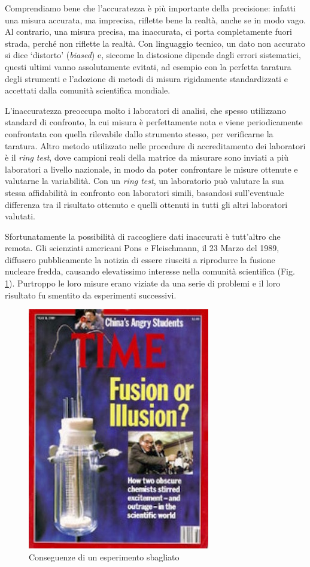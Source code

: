 \documentclass[a4paper,12pt,oneside]{book}
\begin{document}
Comprendiamo bene che l'accuratezza è più importante della precisione: infatti una misura accurata, ma imprecisa, riflette bene la realtà, anche se in modo vago. Al contrario, una misura precisa, ma inaccurata, ci porta completamente fuori strada, perché non riflette la realtà. Con linguaggio tecnico, un dato non accurato si dice `distorto' (\emph{biased}) e, siccome la distosione dipende dagli errori sistematici, questi ultimi vanno assolutamente evitati, ad esempio con la perfetta taratura degli strumenti e l'adozione di metodi di misura rigidamente standardizzati e accettati dalla comunità scientifica mondiale.

L'inaccuratezza preoccupa molto i laboratori di analisi, che spesso utilizzano standard di confronto, la cui misura è perfettamente nota e viene periodicamente confrontata con quella rilevabile dallo strumento stesso, per verificarne la taratura. Altro metodo utilizzato nelle procedure di accreditamento dei laboratori è il \emph{ring test}, dove campioni reali della matrice da misurare sono inviati a più laboratori a livello nazionale, in modo da poter confrontare le misure ottenute e valutarne la variabilità. Con un \emph{ring test}, un laboratorio può valutare la sua stessa affidabilità in confronto con laboratori simili, basandosi sull'eventuale differenza tra il risultato ottenuto e quelli ottenuti in tutti gli altri laboratori valutati.

Sfortunatamente la possibilità di raccogliere dati inaccurati è tutt'altro che remota. Gli scienziati americani Pons e Fleischmann, il 23 Marzo del 1989, diffusero pubblicamente la notizia di essere riusciti a riprodurre la fusione nucleare fredda, causando elevatissimo interesse nella comunità scientifica (Fig. \ref{fig:figName2}). Purtroppo le loro misure erano viziate da una serie di problemi e il loro risultato fu smentito da esperimenti successivi.

\begin{figure}

{\centering \includegraphics[width=0.5\linewidth]{_images/FalseResults} 

}

\caption{Conseguenze di un esperimento sbagliato}\label{fig:figName2}
\end{figure}
\end{document}
